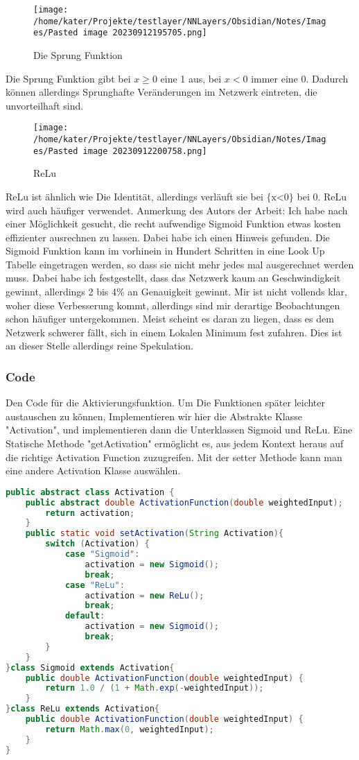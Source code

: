 \documentclass[12pt]{article}
\begin{document}
\begin{figure}[H]
\centering
\texttt{[image: /home/kater/Projekte/testlayer/NNLayers/Obsidian/Notes/Images/Pasted image 20230912195705.png]}
\caption{Die Sprung Funktion}
\label{Was kommt hier rein?}\end{figure}
Die Sprung Funktion gibt bei $x \ge 0$ eine 1 aus, bei $x<0$ immer eine 0.
Dadurch können allerdings Sprunghafte Veränderungen im Netzwerk eintreten, die unvorteilhaft sind.
\begin{figure}[H]
\centering
\texttt{[image: /home/kater/Projekte/testlayer/NNLayers/Obsidian/Notes/Images/Pasted image 20230912200758.png]}
\caption{ReLu}
\label{Was kommt hier rein?}\end{figure}
ReLu ist ähnlich wie Die Identität, allerdings verläuft sie bei $\text{\{x<0\}}$ bei 0.
ReLu wird auch häufiger verwendet. Anmerkung des Autors der Arbeit: Ich habe nach einer Möglichkeit gesucht, die recht aufwendige Sigmoid Funktion etwas kosten effizienter ausrechnen zu lassen. Dabei habe ich einen Hinweis gefunden. Die Sigmoid Funktion kann im vorhinein in Hundert Schritten in eine Look Up Tabelle eingetragen werden, so dass sie nicht mehr jedes mal ausgerechnet werden muss. Dabei habe ich festgestellt, dass das Netzwerk kaum an Geschwindigkeit gewinnt, allerdings 2 bis 4\% an Genauigkeit gewinnt. Mir ist nicht vollends klar, woher diese Verbesserung kommt, allerdings sind mir derartige Beobachtungen schon häufiger untergekommen. Meist scheint es daran zu liegen, dass es dem Netzwerk schwerer fällt, sich in einem Lokalen Minimum fest zufahren. Dies ist an dieser Stelle allerdings reine Spekulation.
\subsubsection{ Code}Den Code für die Aktivierungsfunktion. Um Die Funktionen später leichter austauschen zu können, Implementieren wir hier die Abstrakte Klasse "Activation", und implementieren dann die Unterklassen Sigmoid und ReLu. Eine Statische Methode "getActivation" ermöglicht es, aus jedem Kontext heraus auf die richtige Activation Function zuzugreifen. Mit der setter Methode kann man eine andere Activation Klasse auswählen.\begin{lstlisting}[language=Java]
public abstract class Activation {
    public abstract double ActivationFunction(double weightedInput);    static Activation activation = new Sigmoid();    public static Activation geActivation(){
        return activation;
    }
    public static void setActivation(String Activation){
        switch (Activation) {
            case "Sigmoid":
                activation = new Sigmoid();
                break;
            case "ReLu":
                activation = new ReLu();
                break;
            default:
                activation = new Sigmoid();
                break;
        }
    }
}class Sigmoid extends Activation{
    public double ActivationFunction(double weightedInput) {
        return 1.0 / (1 + Math.exp(-weightedInput));
    }
}class ReLu extends Activation{
    public double ActivationFunction(double weightedInput) {
        return Math.max(0, weightedInput);
    }
}
\end{lstlisting}
\end{document}
